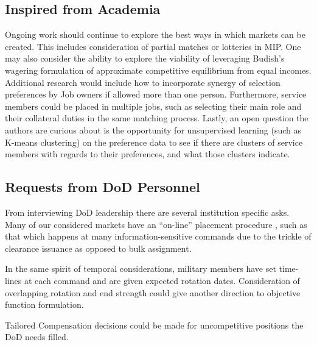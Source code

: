 \subsection{Inspired from Academia}

Ongoing work should continue to explore the best ways in which markets can be created. This includes consideration of partial matches or lotteries in MIP.\citep{1993_Roth} One may also consider the ability to explore the viability of leveraging Budish's wagering formulation of approximate competitive equilibrium from equal incomes.  \citep{2011_Budish} Additional research would include how to incorporate synergy of selection preferences by Job owners if allowed more than one person. \citep{1985_Roth_b}  Furthermore, service members could be placed in multiple jobs, such as selecting their main role and their collateral duties in the same matching process. \citep{1982_Roth} Lastly, an open question the authors are curious about is the opportunity for unsupervised learning (such as K-means clustering) on the preference data to see if there are clusters of service members with regards to their preferences, and what those clusters indicate.

\subsection{Requests from DoD Personnel}

From interviewing DoD leadership there are several institution specific asks. Many of our considered markets have an “on-line” placement procedure \citep{1994_Khuller}, such as that which happens at many information-sensitive commands due to the trickle of clearance issuance as opposed to bulk assignment. 

In the same spirit of temporal considerations, military members have set time-lines at each command and are given expected rotation dates. Consideration of overlapping rotation and end strength could give another direction to objective function formulation.

Tailored Compensation decisions could be made for uncompetitive positions the DoD needs filled.

